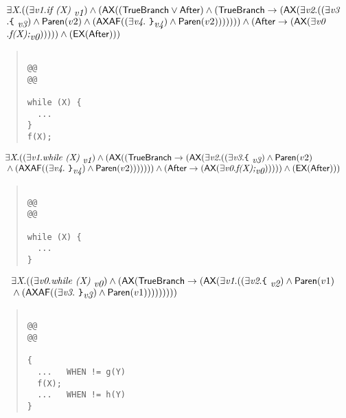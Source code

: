 \documentclass{article}
\newcommand{\AX}{\mbox{\sf{AX}}}
\newcommand{\EX}{\mbox{\sf{EX}}}
\newcommand{\AF}{\mbox{\sf{AF}}}
\newcommand{\mita}[1]{\mbox{\it{{#1}}}}
\newcommand{\msf}[1]{\mbox{\sf{{#1}}}}
\newcommand{\ttlb}{\mbox{\tt \char'173}}
\newcommand{\ttrb}{\mbox{\tt \char'175}}
\begin{document}
\[\begin{array}{l}
\exists \mita{X} . ((\exists \mita{v1} . \mita{if (X) }_{\mita{v1}}) \wedge (\AX((\msf{TrueBranch} \vee \msf{After}) \wedge (\msf{TrueBranch} \rightarrow (\AX(\exists \mita{v2} . ((\exists \mita{v3}\\\mbox{} . \mita{{\ttlb}
  }_{\mita{v3}}) \wedge \msf{Paren}(v2) \wedge (\AX\AF((\exists \mita{v4} . \mita{
{\ttrb}}_{\mita{v4}}) \wedge \msf{Paren}(v2))))))) \wedge (\msf{After} \rightarrow (\AX(\exists \mita{v0}\\\mbox{} . \mita{f(X);}_{\mita{v0}}))))) \wedge (\EX(\msf{After})))
\end{array}\]

\begin{quote}\begin{verbatim}

@@
@@

while (X) {
  ...
}
f(X);
\end{verbatim}\end{quote}

\[\begin{array}{l}
\exists \mita{X} . ((\exists \mita{v1} . \mita{while (X) }_{\mita{v1}}) \wedge (\AX((\msf{TrueBranch} \rightarrow (\AX(\exists \mita{v2} . ((\exists \mita{v3} . \mita{{\ttlb}
  }_{\mita{v3}}) \wedge \msf{Paren}(v2)\\\mbox{} \wedge (\AX\AF((\exists \mita{v4} . \mita{
{\ttrb}}_{\mita{v4}}) \wedge \msf{Paren}(v2))))))) \wedge (\msf{After} \rightarrow (\AX(\exists \mita{v0} . \mita{f(X);}_{\mita{v0}}))))) \wedge (\EX(\msf{After})))
\end{array}\]

\begin{quote}\begin{verbatim}

@@
@@

while (X) {
  ...
}
\end{verbatim}\end{quote}

\[\begin{array}{l}
\exists \mita{X} . ((\exists \mita{v0} . \mita{while (X) }_{\mita{v0}}) \wedge (\AX(\msf{TrueBranch} \rightarrow (\AX(\exists \mita{v1} . ((\exists \mita{v2} . \mita{{\ttlb}
  }_{\mita{v2}}) \wedge \msf{Paren}(v1)\\\mbox{} \wedge (\AX\AF((\exists \mita{v3} . \mita{
{\ttrb}}_{\mita{v3}}) \wedge \msf{Paren}(v1)))))))))
\end{array}\]

\begin{quote}\begin{verbatim}

@@
@@

{
  ...   WHEN != g(Y)
  f(X);
  ...   WHEN != h(Y)
}
\end{verbatim}\end{quote}
\end{document}
